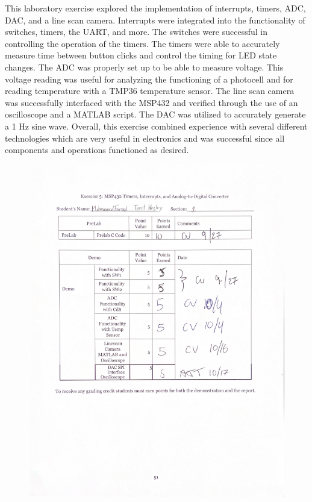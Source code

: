 \documentclass[CMPE]{KGCOEReport}
\begin{document}
This laboratory exercise explored the implementation of interrupts, timers, ADC, DAC, and a line scan camera. Interrupts were integrated into the functionality of switches, timers, the UART, and more. The switches were successful in controlling the operation of the timers. The timers were able to accurately measure time between button clicks and control the timing for LED state changes. The ADC was properly set up to be able to measure voltage. This voltage reading was useful for analyzing the functioning of a photocell and for reading temperature with a TMP36 temperature sensor. The line scan camera was successfully interfaced with the MSP432 and verified through the use of an oscilloscope and a MATLAB script. The DAC was utilized to accurately generate a 1 Hz sine wave. Overall, this exercise combined experience with several different technologies which are very useful in electronics and was successful since all components and operations functioned as desired. 

\newpage
\begin{figure}[H]
    \centering
    \begin{adjustbox}{center}
        \includegraphics[width=1.26\textwidth]{signoff.pdf}
    \end{adjustbox}
\end{figure}
\end{document}
